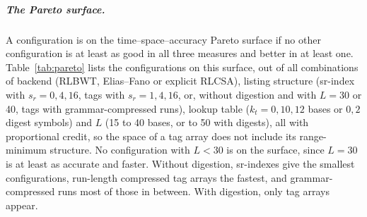 \subparagraph*{The Pareto surface.}
A configuration is on the time--space--accuracy Pareto surface if no other configuration is at least as good in all three measures and better in at least one.
Table~\ref{tab:pareto} lists the configurations on this surface, out of all combinations of backend (RLBWT, Elias--Fano or explicit RLCSA), listing structure (sr-index with $s_r = 0, 4, 16$, tags with $s_r = 1, 4, 16$, or, without digestion and with $L = 30$ or 40, tags with grammar-compressed runs), lookup table ($k_t = 0, 10, 12$ bases or $0, 2$ digest symbols) and $L$ (15 to 40 bases, or to 50 with digests), all with proportional credit, so the space of a tag array does not include its range-minimum structure.
No configuration with $L < 30$ is on the surface, since $L = 30$ is at least as accurate and faster.
Without digestion, sr-indexes give the smallest configurations, run-length compressed tag arrays the fastest, and grammar-compressed runs most of those in between.
With digestion, only tag arrays appear.


